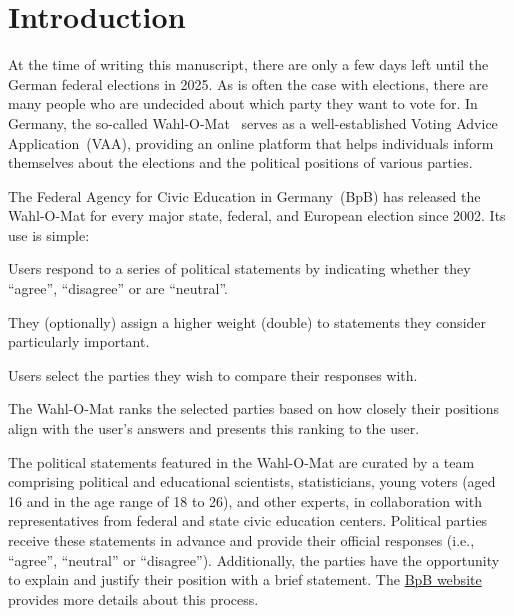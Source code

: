 \documentclass[
	fontsize=10pt,          %
	numbers=noenddot,    	%
    parskip=half,        	%
    listof=totoc,        	%
    bibliography=totoc,  	%
	headsepline=true,       %
	footsepline=false, 		%
    DIV=12                	%
]{scrartcl}
\begin{document}
\section{Introduction}%
At the time of writing this manuscript, there are only a few days left until the German federal elections in 2025. As is often the case with elections, there are many people who are undecided about which party they want to vote for.
In Germany, the so-called Wahl-O-Mat~\nocite{wahlomat2025} serves as a well-established Voting Advice Application~(VAA), providing an online platform that helps individuals inform themselves about the elections and the political positions of various parties.

{The Federal Agency for Civic Education in Germany~(BpB) has released the Wahl-O-Mat for every major state, federal, and European election since 2002.
Its use is simple: 
\begin{enumerate*}[label={(\arabic*)}]
    \item Users respond to a series of political statements by indicating whether they ``agree'', ``disagree'' or are ``neutral''.
    \item They (optionally) assign a higher weight (double) to statements they consider particularly important.
    \item Users select the parties they wish to compare their responses with. 
    \item The Wahl-O-Mat ranks the selected parties based on how closely their positions align with the user's answers and presents this ranking to the user. 
\end{enumerate*}
}

{The political statements featured in the Wahl-O-Mat are  curated by a team comprising political and educational scientists, statisticians, young voters (aged 16 and in the age range of 18 to 26), and other experts, in collaboration with representatives from federal and state civic education centers.}
Political parties receive these statements in advance and provide their official responses (i.e., ``agree'', ``neutral'' or ``disagree'').
Additionally, the parties have the opportunity to explain and justify their position with a brief statement. 
The \href{https://www.bpb.de/themen/wahl-o-mat/}{BpB website} provides more details about this process.\nocite{bpb2025}
\end{document}
